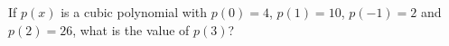 If $p(x)$ is a cubic polynomial with $p(0)=4$, $p(1)=10$, $p(-1)=2$ and $p(2)=26$, what is the value of $p(3)$?
